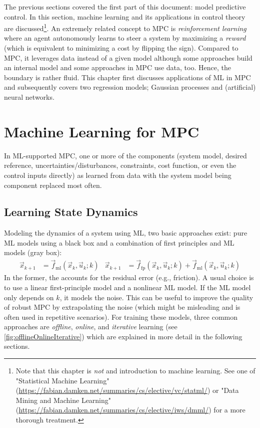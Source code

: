 	The previous sections covered the first part of this document: model predictive control. In this section, machine learning and its applications in control theory are discussed\footnote{Note that this chapter is \emph{not} and introduction to machine learning. See one of "Statistical Machine Learning" (\url{https://fabian.damken.net/summaries/cs/elective/vc/statml/}) or "Data Mining and Machine Learning" (\url{https://fabian.damken.net/summaries/cs/elective/iws/dmml/}) for a more thorough treatment.}. An extremely related concept to MPC is \emph{reinforcement learning} where an agent autonomously learns to steer a system by maximizing a \emph{reward} (which is equivalent to minimizing a cost by flipping the sign). Compared to MPC, it leverages data instead of a given model although some approaches build an internal model and some approaches in MPC use data, too. Hence, the boundary is rather fluid. This chapter first discusses applications of ML in MPC and subsequently covers two regression models; Gaussian processes and (artificial) neural networks.

	\section{Machine Learning for MPC}
		In ML-supported MPC, one or more of the components (system model, desired reference, uncertainties/disturbances, constraints, cost function, or even the control inputs directly) as learned from data with the system model being component replaced most often.

		\label{10.3, 10.4}

		\subsection{Learning State Dynamics}
			Modeling the dynamics of a system using ML, two basic approaches exist: pure ML models using a black box and a combination of first principles and ML models (gray box):
			\begin{align}
				\vec{x}_{k + 1} &= \vec{f}_\mathrm{ml}(\vec{x}_k, \vec{u}_k; k) &
				\vec{x}_{k + 1} &= \vec{f}_\mathrm{fp}(\vec{x}_k, \vec{u}_k; k) + \vec{f}_\mathrm{ml}(\vec{x}_k, \vec{u}_k; k)
			\end{align}
			In the former, the accounts for the residual error (e.g., friction). A usual choice is to use a linear first-principle model and a nonlinear ML model. If the ML model only depends on \(k\), it models the noise. This can be useful to improve the quality of robust MPC by extrapolating the noise (which might be misleading and is often used in repetitive scenarios). For training these models, three common approaches are \emph{offline}, \emph{online}, and \emph{iterative} learning (see \autoref{fig:offlineOnlineIterative}) which are explained in more detail in the following sections.


